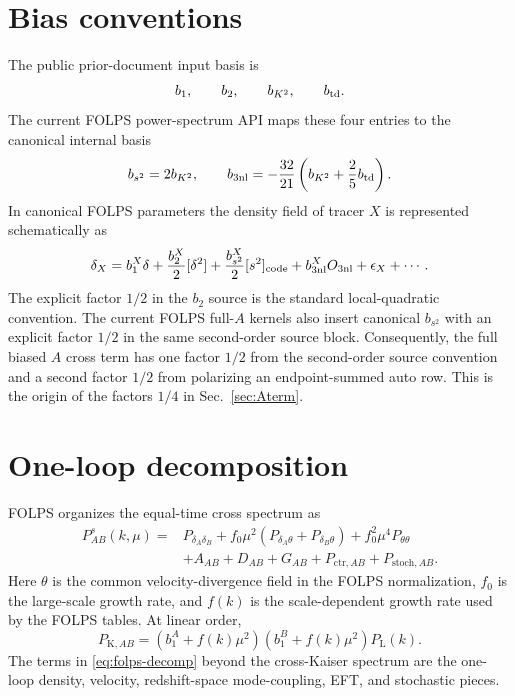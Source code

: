 \documentclass[11pt]{article}
\newcommand{\PL}{P_{\mathrm L}}
\newcommand{\bsst}{b_{s^2}}
\begin{document}
\section{Bias conventions}

The public prior-document input basis is
\begin{equation}
  b_1,\qquad b_2,\qquad b_{K^2},\qquad b_{\rm td}.
\end{equation}
The current FOLPS power-spectrum API maps these four entries to the canonical
internal basis
\begin{equation}
  b_{s^2}=2b_{K^2},
  \qquad
  b_{3\mathrm{nl}}
  =
  -\frac{32}{21}
  \left(
    b_{K^2}+\frac{2}{5}b_{\rm td}
  \right).
  \label{eq:priordoc-map}
\end{equation}
In canonical FOLPS parameters the density field of tracer $X$ is represented
schematically as
\begin{equation}
  \delta_X
  =
  b_1^X\delta
  +\frac{b_2^X}{2}[\delta^2]
  +\frac{\bsst^X}{2}[s^2]_{\rm code}
  +b_{3\mathrm{nl}}^X O_{3\mathrm{nl}}
  +\epsilon_X+\cdots .
\end{equation}
The explicit factor $1/2$ in the $b_2$ source is the standard local-quadratic
convention.  The current FOLPS full-$A$ kernels also insert canonical
$b_{s^2}$ with an explicit factor $1/2$ in the same second-order source block.
Consequently, the full biased $A$ cross term has one factor $1/2$ from the
second-order source convention and a second factor $1/2$ from polarizing an
endpoint-summed auto row.  This is the origin of the factors $1/4$ in
Sec.~\ref{sec:Aterm}.

\section{One-loop decomposition}

FOLPS organizes the equal-time cross spectrum as
\begin{align}
  P_{AB}^{s}(k,\mu)
  ={}&
  P_{\delta_A\delta_B}
  +f_0\mu^2
  \left(
    P_{\delta_A\theta}
    +
    P_{\delta_B\theta}
  \right)
  +f_0^2\mu^4P_{\theta\theta}
  \nonumber\\
  &+A_{AB}
  +D_{AB}
  +G_{AB}
  +P_{\mathrm{ctr},AB}
  +P_{\mathrm{stoch},AB}.
  \label{eq:folps-decomp}
\end{align}
Here $\theta$ is the common velocity-divergence field in the FOLPS
normalization, $f_0$ is the large-scale growth rate, and $f(k)$ is the
scale-dependent growth rate used by the FOLPS tables.  At linear order,
\begin{equation}
  P_{\mathrm K,AB}
  =
  \left(b_1^A+f(k)\mu^2\right)
  \left(b_1^B+f(k)\mu^2\right)
  \PL(k).
  \label{eq:kaiser}
\end{equation}
The terms in \eqref{eq:folps-decomp} beyond the cross-Kaiser spectrum are the
one-loop density, velocity, redshift-space mode-coupling, EFT, and stochastic
pieces.
\end{document}
